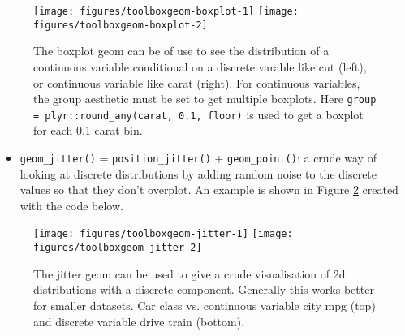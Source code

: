 \begin{figure}

{\centering \texttt{[image: figures/toolboxgeom-boxplot-1]} \texttt{[image: figures/toolboxgeom-boxplot-2]} 

}

\caption{The boxplot geom can be of use to see the distribution of a continuous variable conditional on a discrete varable like cut (left), or continuous variable like carat (right). For continuous variables, the group aesthetic must be set to get multiple boxplots. Here \texttt{group = plyr::round\_any(carat, 0.1, floor)} is used to get a boxplot for each 0.1 carat bin.\label{fig:geom-boxplot}}
\end{figure}

\begin{itemize}
\itemsep1pt\parskip0pt
\item
  \texttt{geom\_jitter()} = \texttt{position\_jitter()} +
  \texttt{geom\_point()}: a crude way of looking at discrete
  distributions by adding random noise to the discrete values so that
  they don't overplot. An example is shown in Figure
  \ref{fig:geom-jitter} created with the code below. 
   
\end{itemize}

\begin{Shaded}
\begin{Highlighting}[]
\NormalTok{)}
\NormalTok{)}
\end{Highlighting}
\end{Shaded}

\begin{figure}

{\centering \texttt{[image: figures/toolboxgeom-jitter-1]} \texttt{[image: figures/toolboxgeom-jitter-2]} 

}

\caption{The jitter geom can be used to give a crude visualisation of 2d distributions with a discrete component. Generally this works better for smaller datasets. Car class vs. continuous variable city mpg (top) and discrete variable drive train (bottom).\label{fig:geom-jitter}}
\end{figure}

